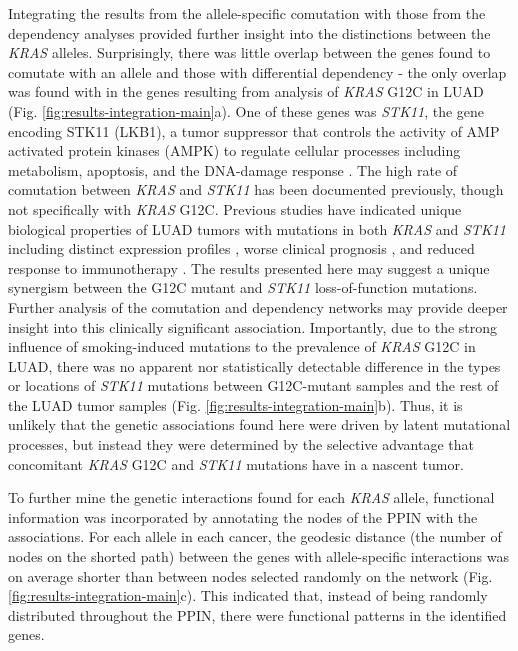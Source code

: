 \documentclass[english, 10pt, letterpaper]{article}
\newcommand{\KRAS}{\emph{KRAS}}
\begin{document}
Integrating the results from the allele-specific comutation with those from the dependency analyses provided further insight into the distinctions between the \KRAS{} alleles.
Surprisingly, there was little overlap between the genes found to comutate with an allele and those with differential dependency - the only overlap was found with in the genes resulting from analysis of \KRAS{} G12C in LUAD (Fig. \ref{fig:results-integration-main}a).
One of these genes was \emph{STK11}, the gene encoding STK11 (LKB1), a tumor suppressor that controls the activity of AMP activated protein kinases (AMPK) to regulate cellular processes including metabolism, apoptosis, and the DNA-damage response \cite{Momcilovic2015TargetingVulnerabilities., Korsse2013TargetingCancer.}.
The high rate of comutation between \KRAS{} and \emph{STK11} has been documented previously, though not specifically with \KRAS{} G12C.
Previous studies have indicated unique biological properties of LUAD tumors with mutations in both \KRAS{} and \emph{STK11} including distinct expression profiles \cite{Skoulidis2015Co-occurringVulnerabilities.}, worse clinical prognosis \cite{LaFleur2019MutationSTK11, Bange2019ImpactCancer.}, and reduced response to immunotherapy \cite{Skoulidis2018STK11/LKB1Adenocarcinoma.}.
The results presented here may suggest a unique synergism between the G12C mutant and \emph{STK11} loss-of-function mutations.
Further analysis of the comutation and dependency networks may provide deeper insight into this clinically significant association.
Importantly, due to the strong influence of smoking-induced mutations to the prevalence of \KRAS{} G12C in LUAD, there was no apparent nor statistically detectable difference in the types or locations of \emph{STK11} mutations between G12C-mutant samples and the rest of the LUAD tumor samples (Fig. \ref{fig:results-integration-main}b).
Thus, it is unlikely that the genetic associations found here were driven by latent mutational processes, but instead they were determined by the selective advantage that concomitant \KRAS{} G12C and \emph{STK11} mutations have in a nascent tumor.

To further mine the genetic interactions found for each \KRAS{} allele, functional information was incorporated by annotating the nodes of the PPIN with the associations.
For each allele in each cancer, the geodesic distance (the number of nodes on the shorted path) between the genes with allele-specific interactions was on average shorter than between nodes selected randomly on the network (Fig. \ref{fig:results-integration-main}c).
This indicated that, instead of being randomly distributed throughout the PPIN, there were functional patterns in the identified genes.
\end{document}
